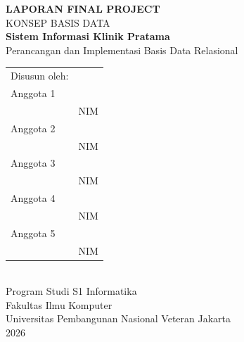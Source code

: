 \documentclass[12pt,a4paper]{article}
\begin{document}
\begin{titlepage}
  \centering
  \vspace*{1.5cm}
  {\Large\textbf{LAPORAN FINAL PROJECT}}\\[0.5em]
  {\large KONSEP BASIS DATA}\\[2em]

  {\LARGE\textbf{Sistem Informasi Klinik Pratama}}\\[1em]
  {\large Perancangan dan Implementasi Basis Data Relasional}\\[3em]

  \begin{tabular}{ll}
    Disusun oleh: & \\[0.6em]
    Anggota 1 & \underline{\hspace{5cm}} \\
              & NIM \underline{\hspace{3cm}} \\[0.4em]
    Anggota 2 & \underline{\hspace{5cm}} \\
              & NIM \underline{\hspace{3cm}} \\[0.4em]
    Anggota 3 & \underline{\hspace{5cm}} \\
              & NIM \underline{\hspace{3cm}} \\[0.4em]
    Anggota 4 & \underline{\hspace{5cm}} \\
              & NIM \underline{\hspace{3cm}} \\[0.4em]
    Anggota 5 & \underline{\hspace{5cm}} \\
              & NIM \underline{\hspace{3cm}} \\
  \end{tabular}\\[2.5em]

  {\large Program Studi S1 Informatika}\\
  {\large Fakultas Ilmu Komputer}\\
  {\large Universitas Pembangunan Nasional Veteran Jakarta}\\
  {\large 2026}
\end{titlepage}
\end{document}

